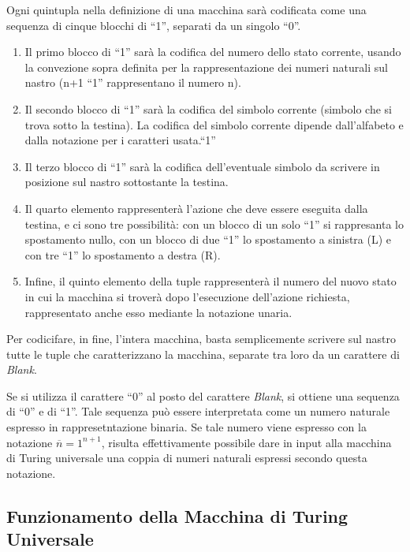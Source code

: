 Ogni quintupla nella definizione di una macchina sar\`a codificata
come una sequenza di cinque blocchi di ``1'', separati da un singolo
``0''.
\begin{enumerate}
  \item Il primo blocco di ``1'' sar\`a la codifica del numero dello
    stato corrente, usando la convezione sopra definita per la
    rappresentazione dei numeri naturali sul nastro (n+1 ``1''
    rappresentano il numero n).
  \item Il secondo blocco di ``1'' sar\`a la codifica del simbolo
    corrente (simbolo che si trova sotto la testina). La codifica del
    simbolo corrente dipende dall'alfabeto e dalla notazione per i
    caratteri usata.``1''
  \item Il terzo blocco di ``1'' sar\`a la codifica dell'eventuale
    simbolo da scrivere in posizione sul nastro sottostante la
    testina.
  \item Il quarto elemento rappresenter\`a l'azione che deve essere
    eseguita dalla testina, e ci sono tre possibilit\`a: con un blocco
    di un solo ``1'' si rappresanta lo spostamento nullo, con un
    blocco di due ``1'' lo spostamento a sinistra (L) e con tre ``1''
    lo spostamento a destra (R).
  \item Infine, il quinto elemento della tuple rappresenter\`a il
    numero del nuovo stato in cui la macchina si trover\`a dopo
    l'esecuzione dell'azione richiesta, rappresentato anche esso
    mediante la notazione unaria.
\end{enumerate}

Per codicifare, in fine, l'intera macchina, basta semplicemente
scrivere sul nastro tutte le tuple che caratterizzano la macchina,
separate tra loro da un carattere di \textit{Blank}.

Se si utilizza il carattere ``0'' al posto del carattere
\textit{Blank}, si ottiene una sequenza di ``0'' e di ``1''. Tale
sequenza pu\`o essere interpretata come un numero naturale espresso in
rappresetntazione binaria. Se tale numero viene espresso con la
notazione $\overline{n}=1^{n+1}$, risulta effettivamente possibile
dare in input alla macchina di Turing universale una coppia di numeri
naturali espressi secondo questa notazione.

\subsection{Funzionamento della Macchina di Turing Universale}

